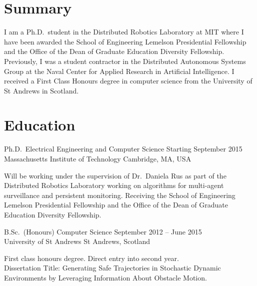 \documentclass[line,margin]{cv}
\begin{document}
\address{Email: \href{mailto:wallar@mit.edu}{wallar@mit.edu}
\\Website: \href{http://wallar.me}
{http://wallar.me}}
\address{Last Updated: \today}

\begin{resume}

\section{Summary}

I am a Ph.D.\ student in the Distributed Robotics Laboratory at MIT
where I have been awarded the School of Engineering Lemelson
Presidential Fellowship and the Office of the Dean of Graduate Education
Diversity Fellowship. Previously, I was a student contractor in the Distributed
Autonomous Systems Group at the Naval Center for Applied Research in Artificial
Intelligence. I received a First Class Honours degree in computer science from
the University of St Andrews in Scotland.

\section{Education}

Ph.D.\ Electrical Engineering and Computer Science
\hfill Starting September 2015 \\
Massachusetts Institute of Technology \hfill Cambridge, MA, USA
\begin{adjustwidth}{2.5em}{2.5em}

    Will be working under the supervision of Dr.\ Daniela Rus as part of the
    Distributed Robotics Laboratory working on algorithms for multi-agent
    surveillance and persistent monitoring. Receiving the School of Engineering
    Lemelson Presidential Fellowship and the Office of the Dean of Graduate
    Education Diversity Fellowship.

\end{adjustwidth}

B.Sc.\ (Honours) Computer Science
\hfill September 2012 -- June 2015 \\
University of St Andrews \hfill St Andrews, Scotland
\begin{adjustwidth}{2.5em}{2.5em}

    First class honours degree. Direct entry into second year.\\ Dissertation
    Title: Generating Safe Trajectories in Stochastic Dynamic Environments by
    Leveraging Information About Obstacle Motion.


\end{adjustwidth}
\end{resume}
\end{document}
